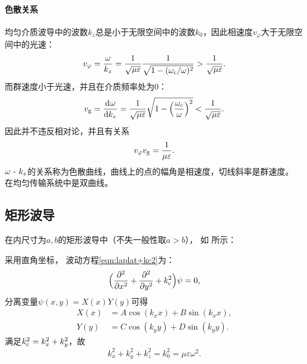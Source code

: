 \paragraph{色散关系}

均匀介质波导中的波数$k_z$总是小于无限空间中的波数$k_0$，因此相速度$v_\varphi$大于无限空间中的光速：
\[
    v_\varphi=\frac\omega{k_z}=\frac1{\sqrt{\mu\varepsilon}}\frac1{\sqrt{1-(\omega\c/\omega)^2}}>\frac1{\sqrt{\mu\varepsilon}}.
\]
而群速度小于光速，并且在介质频率处为0：
\[
    v_\text g=\dv\omega{k_z}=\frac1{\sqrt{\mu\varepsilon}}\sqrt{1-\Bigkh{\frac{\omega\c}\omega}^2}<\frac1{\sqrt{\mu\varepsilon}}.
\]
因此并不违反相对论，并且有关系
\begin{equation}
    v_\varphi v_\text g=\frac1{\mu\varepsilon}.
\end{equation}
$\omega\vs k_z$的关系称为色散曲线，曲线上的点的幅角是相速度，切线斜率是群速度。
在均匀传输系统中是双曲线。

\subsection{矩形波导}
\label{ssec:rectangular waveguide}

在内尺寸为$a,b$的矩形波导中（不失一般性取$a>b$），
如 所示：
\begin{center}
    \label{fig:rectangle waveguide}
\end{center}
采用直角坐标，
波动方程\eqref{eqn:laplat+kc2}为：
\begin{equation}
    \Bigkh{\pp[2]x+\pp[2]y+k\c^2}\psi=0,
\end{equation}
分离变量$\psi(x,y)=X(x)Y(y)$可得
\begin{align*}
    X(x)&=A\cos(k_xx)+B\sin(k_xx),\\
    Y(y)&=C\cos(k_yy)+D\sin(k_yy).
\end{align*}
满足$k\c^2=k_x^2+k_y^2$，故
\begin{equation}
    k_x^2+k_y^2+k_z^2=k_0^2=\mu\varepsilon\omega^2.
\end{equation}

